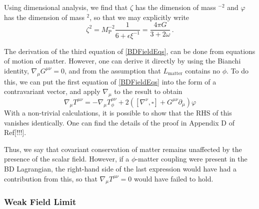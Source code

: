 \documentclass[12pt]{article}
\begin{document}
Using dimensional analysis, we find that $\zeta$ has the dimension of mass ${ }^{-2}$ and $\varphi$ has the dimension of mass ${ }^{2}$, so that we may explicitly write
\begin{equation}
\zeta^{2}=M_{\mathrm{P}}^{-2} \frac{1}{6+\epsilon \xi^{-1}}=\frac{4 \pi G}{3+2 \omega} \,.
\end{equation}


The derivation of the third equation of \eqref{BDFieldEqs}, can be done from equations of motion of matter. 
However, one can derive it directly by using the Bianchi identity, $\nabla_{\mu} G^{\mu \nu}=0$, and from the assumption that $L_{\text{matter}}$ contains no $\phi$. 
To do this, we can put the first equation of \eqref{BDFieldEqs} into the form of a contravariant vector, and apply $\nabla_{\mu}$ to the result to obtain
\begin{equation}
\nabla_{\mu} T^{\mu \nu}=-\nabla_{\mu} T_{\phi}^{\mu \nu}+2\left(\left[\nabla^{\nu}, \square\right]+G^{\mu \nu} \partial_{\mu}\right) \varphi
\end{equation}
With a non-trivial calculations, it is possible to show that the RHS of this vanishes identically. One can find the details of the proof in Appendix D of Ref[!!!].

Thus, we say that covariant conservation of matter remains unaffected by the presence of the scalar field. However, if a $\phi$-matter coupling were present in the BD Lagrangian, the right-hand side of the last expression would have had a contribution from this, so that $\nabla_\mu T^{\mu \nu}=0$ would have failed to hold.

\subsubsection{Weak Field Limit}
\end{document}
